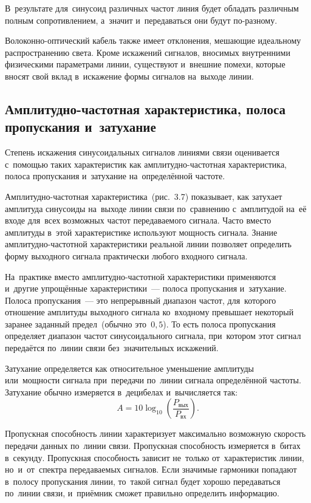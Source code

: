 \documentclass[
	a4paper,
	oneside,
	BCOR = 10mm,
	DIV = 12,
	12pt,
	headings = normal,
]{scrartcl}
\begin{document}
				В~результате для~синусоид различных частот линия будет обладать различным полным сопротивлением, а~значит и~передаваться они будут по-разному.

				Волоконно-оптический кабель также имеет отклонения, мешающие идеальному распространению света. Кроме искажений сигналов, вносимых внутренними физическими параметрами линии, существуют и~внешние помехи, которые вносят свой вклад в~искажение формы сигналов на~выходе линии.

			\subsection{Амплитудно-частотная характеристика, полоса пропускания и~затухание}
				Степень искажения синусоидальных сигналов линиями связи оценивается с~помощью таких характеристик как амплитудно-частотная характеристика, полоса пропускания и~затухание на~определённой частоте.

				Амплитудно-частотная характеристика~(рис.~3.7) показывает, как затухает амплитуда синусоиды на~выходе линии связи по~сравнению с~амплитудой на~её входе для~всех возможных частот передаваемого сигнала. Часто вместо амплитуды в~этой характеристике используют мощность сигнала. Знание амплитудно-частотной характеристики реальной линии позволяет определить форму выходного сигнала практически любого входного сигнала.

				На~практике вместо амплитудно-частотной характеристики применяются и~другие упрощённые характеристики~— полоса пропускания и~затухание. Полоса пропускания~— это непрерывный диапазон частот, для~которого отношение амплитуды выходного сигнала ко~входному превышает некоторый заранее заданный предел~(обычно это~$0{,}5$). То есть полоса пропускания определяет диапазон частот синусоидального сигнала, при~котором этот сигнал передаётся по~линии связи без~значительных искажений.

				Затухание определяется как относительное уменьшение амплитуды или~мощности сигнала при~передачи по~линии сигнала определённой частоты. Затухание обычно измеряется в~децибелах и~вычисляется так:
				\[
					A = 10 \log_{10} \left( \frac{P_{\text{вых}}}{P_{\text{вх}}} \right).
				\]

				Пропускная способность линии характеризует максимально возможную скорость передачи данных по~линии связи. Пропускная способность измеряется в~битах в~секунду. Пропускная способность зависит не~только от~характеристик линии, но~и~от~спектра передаваемых сигналов. Если значимые гармоники попадают в~полосу пропускания линии, то~такой сигнал будет хорошо передаваться по~линии связи, и~приёмник сможет правильно определить информацию.
\end{document}
